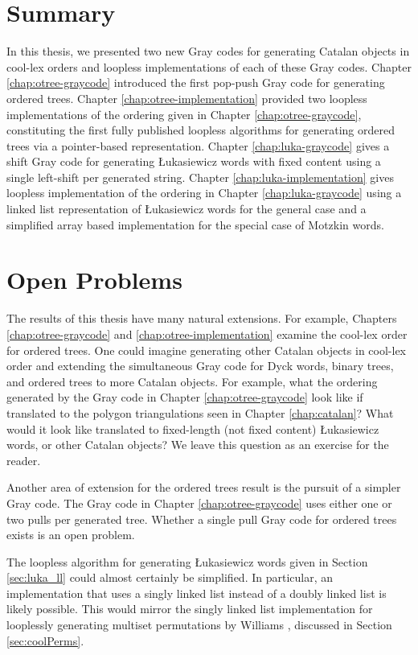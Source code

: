 \section{Summary} 
In this thesis, we presented two new Gray codes for generating Catalan objects in cool-lex orders and loopless implementations of each of these Gray codes.  Chapter \ref{chap:otree-graycode} introduced the first pop-push Gray code for generating ordered trees.  Chapter \ref{chap:otree-implementation} provided two loopless implementations of the ordering given in Chapter \ref{chap:otree-graycode}, constituting the first fully published loopless algorithms for generating ordered trees via a pointer-based representation.  Chapter \ref{chap:luka-graycode} gives a shift Gray code for generating Łukasiewicz words with fixed content using a single left-shift per generated string. Chapter \ref{chap:luka-implementation} gives loopless implementation of the ordering in Chapter \ref{chap:luka-graycode} using a linked list representation of Łukasiewicz words for the general case and a simplified array based implementation for the special case of Motzkin words.

\section{Open Problems}

The results of this thesis have many natural extensions.  For example, Chapters \ref{chap:otree-graycode} and \ref{chap:otree-implementation} examine the cool-lex order for ordered trees. One could imagine generating other Catalan objects in cool-lex order and extending the simultaneous Gray code for Dyck words, binary trees, and ordered trees to more Catalan objects.  For example, what the ordering generated by the Gray code in Chapter \ref{chap:otree-graycode} look like if translated to the polygon triangulations seen in Chapter \ref{chap:catalan}?  What would it look like translated to fixed-length (not fixed content) Łukasiewicz words, or other Catalan objects? We leave this question as an exercise for the reader.  

Another area of extension for the ordered trees result is the pursuit of a simpler Gray code. The Gray code in Chapter \ref{chap:otree-graycode} uses either one or two pulls per generated tree.  Whether a single pull Gray code for ordered trees exists is an open problem.  

The loopless algorithm for generating Łukasiewicz words given in Section \ref{sec:luka_ll} could almost certainly be simplified.  In particular, an implementation that uses a singly linked list instead of a doubly linked list  is likely possible.  This would mirror the singly linked list implementation for looplessly generating multiset permutations by Williams \cite{williams2009loopless}, discussed in Section \ref{sec:coolPerms}.

